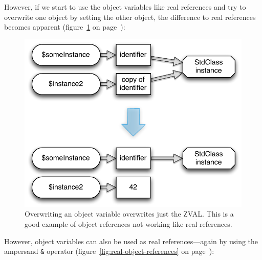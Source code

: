 However, if we start to use the object variables like real references and try to overwrite one object by setting the other object, the difference to real references becomes apparent (figure~\ref{fig:false-object-references} on page~\pageref{fig:false-object-references}):



\begin{figure}[!h]
  \begin{center}
    \includegraphics[scale=0.8]{images/someInstance_instance2}
    \caption{Overwriting an object variable overwrites just the ZVAL. This is a good example of object references not working like real references.}
    \label{fig:false-object-references}
  \end{center}
\end{figure}

However, object variables can also be used as real references---again by using the ampersand \texttt{\&} operator (figure~\ref{fig:real-object-references} on page~\pageref{fig:real-object-references}):


